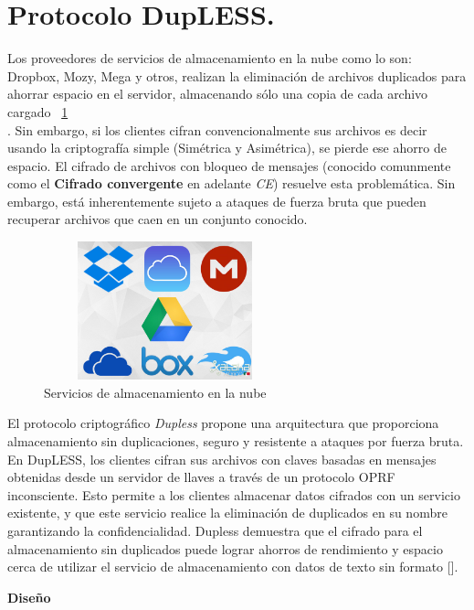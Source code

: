 \section{Protocolo DupLESS. }
Los proveedores de servicios de almacenamiento en la nube como lo son:  Dropbox, Mozy, Mega y otros, realizan la eliminación de archivos duplicados para ahorrar espacio en el servidor, almacenando sólo una copia de cada archivo cargado ~\ref{fig:4-0-1} \\
. Sin embargo, si los clientes cifran convencionalmente sus archivos es decir usando la criptografía simple (Simétrica y Asimétrica), se pierde ese ahorro de espacio. El cifrado de archivos con bloqueo de mensajes (conocido comunmente como el \textbf{Cifrado convergente} en adelante \textit{CE}) resuelve esta problemática. Sin embargo, está inherentemente sujeto a ataques de fuerza bruta que pueden recuperar archivos que caen en un conjunto conocido.\\


\begin{figure}[H]
\centering
	\includegraphics[width=7cm, height=4cm]{./images/servicios_nube.jpg}
	\caption{Servicios de almacenamiento en la nube}
	\label{fig:4-0-1}
\end{figure}

El protocolo criptográfico \textit{Dupless} propone una arquitectura que proporciona almacenamiento sin duplicaciones, seguro y resistente a ataques por fuerza bruta. En DupLESS, los clientes cifran sus archivos con claves basadas en mensajes obtenidas
desde un servidor de llaves a través de un protocolo OPRF inconsciente. Esto permite a los clientes almacenar datos cifrados con un servicio existente, y que este servicio realice la eliminación de duplicados en su nombre garantizando la confidencialidad. Dupless demuestra que el cifrado para el almacenamiento sin duplicados puede lograr ahorros de rendimiento y espacio cerca de utilizar el servicio de almacenamiento con datos de texto sin formato [].



\textbf{Diseño} \\

